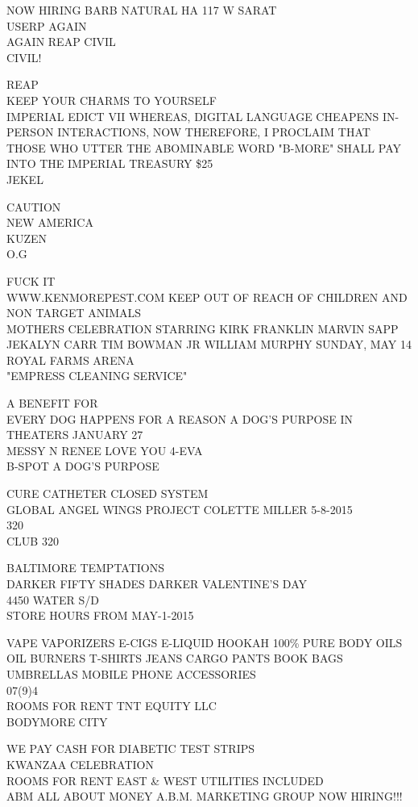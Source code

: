 \documentclass[10pt,letterpaper]{article}
\begin{document}
NOW HIRING BARB NATURAL HA 117 W SARAT\\
USERP AGAIN\\
AGAIN REAP CIVIL\\
CIVIL!

REAP\\
KEEP YOUR CHARMS TO YOURSELF\\
IMPERIAL EDICT VII WHEREAS, DIGITAL LANGUAGE CHEAPENS IN{-}PERSON INTERACTIONS, NOW THEREFORE, I PROCLAIM THAT THOSE WHO UTTER THE ABOMINABLE WORD "B{-}MORE" SHALL PAY INTO THE IMPERIAL TREASURY \$25\\
JEKEL

CAUTION\\
NEW AMERICA\\
KUZEN\\
O.G

FUCK IT\\
WWW.KENMOREPEST.COM KEEP OUT OF REACH OF CHILDREN AND NON TARGET ANIMALS\\
MOTHERS CELEBRATION STARRING KIRK FRANKLIN MARVIN SAPP JEKALYN CARR TIM BOWMAN JR WILLIAM MURPHY SUNDAY, MAY 14 ROYAL FARMS ARENA\\
"EMPRESS CLEANING SERVICE"

A BENEFIT FOR\\
EVERY DOG HAPPENS FOR A REASON A DOG'S PURPOSE IN THEATERS JANUARY 27\\
MESSY N RENEE LOVE YOU 4{-}EVA\\
B{-}SPOT A DOG'S PURPOSE

CURE CATHETER CLOSED SYSTEM\\
GLOBAL ANGEL WINGS PROJECT COLETTE MILLER 5{-}8{-}2015\\
320\\
CLUB 320

BALTIMORE TEMPTATIONS\\
DARKER FIFTY SHADES DARKER VALENTINE'S DAY\\
4450 WATER S/D\\
STORE HOURS FROM MAY{-}1{-}2015

VAPE VAPORIZERS E{-}CIGS E{-}LIQUID HOOKAH 100\% PURE BODY OILS OIL BURNERS T{-}SHIRTS JEANS CARGO PANTS BOOK BAGS UMBRELLAS MOBILE PHONE ACCESSORIES\\
07(9)4\\
ROOMS FOR RENT TNT EQUITY LLC\\
BODYMORE CITY

WE PAY CASH FOR DIABETIC TEST STRIPS\\
KWANZAA CELEBRATION\\
ROOMS FOR RENT EAST \& WEST UTILITIES INCLUDED\\
ABM ALL ABOUT MONEY A.B.M. MARKETING GROUP NOW HIRING!!!
\end{document}
